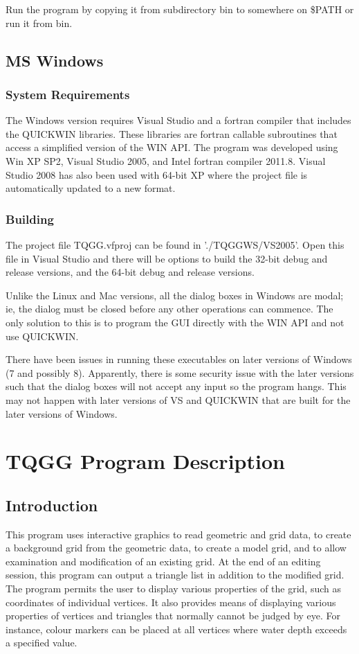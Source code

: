 \documentclass{article}
\begin{document}
Run the program by copying it from subdirectory bin to somewhere on \$PATH or run it from bin. 

\subsection{MS Windows}
\subsubsection{System Requirements}
The Windows version requires Visual Studio and a fortran compiler that includes the QUICKWIN
libraries. These libraries are fortran callable subroutines that access a simplified version
of the WIN API. The program was developed using Win XP SP2, Visual Studio 2005, and Intel fortran
compiler 2011.8. Visual Studio 2008 has also been used with 64-bit XP where the project file is
automatically updated to a new format.

\subsubsection{Building}
The project file TQGG.vfproj can be found in './TQGGWS/VS2005'. Open this file in Visual Studio
and there will be options to build the 32-bit debug and release versions, and the 64-bit debug 
and release versions.

Unlike the Linux and Mac versions, all the dialog boxes in Windows are modal; ie, the dialog must be 
closed before any other operations can commence. The only solution to this is to program the GUI
directly with the WIN API and not use QUICKWIN.

There have been issues in running these executables on later versions of Windows (7 and possibly 8).
Apparently, there is some security issue with the later versions such that the dialog boxes will
not accept any input so the program hangs. This may not happen with later versions of VS and QUICKWIN that
are built for the later versions of Windows.




\newpage
\section{TQGG Program Description}

\label{bkm:Ref406485171}\label{bkm:Ref406484745}\subsection{Introduction}
This program uses interactive graphics to read geometric and grid data, to create a background grid from the geometric data, to create a model grid, and to allow examination and modification of an existing grid. At the end of an editing session, this program can output a triangle list in addition to the modified grid. The program permits the user to display various properties of the grid, such as coordinates of individual vertices. It also provides means of displaying various properties of vertices and triangles that normally cannot be judged by eye. For instance, colour markers can be placed at all vertices where water depth exceeds a specified value.
\end{document}
